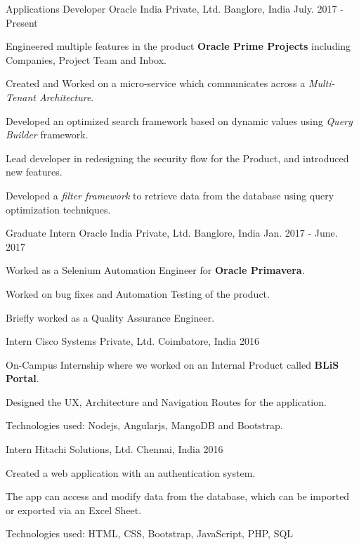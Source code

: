 \begin{cventries}
  \cventry
    {Applications Developer}
    {Oracle India Private, Ltd.}
    {Banglore, India}
    {July. 2017 - Present}
    {
      \begin{cvitems}
        \item {Engineered multiple features in the product \textbf{Oracle Prime Projects} including Companies, Project Team and Inbox.}
        \item {Created and Worked on a micro-service which communicates across a \textit{Multi-Tenant Architecture}.}
        \item {Developed an optimized search framework based on dynamic values using \textit{Query Builder} framework.}
        \item {Lead developer in redesigning the security flow for the Product, and introduced new features.}
        \item {Developed a \textit{filter framework} to retrieve data from the database using query optimization techniques.}
      \end{cvitems}
    }
  \cventry
    {Graduate Intern}
    {Oracle India Private, Ltd.}
    {Banglore, India}
    {Jan. 2017 - June. 2017}
    {
      \begin{cvitems}
        \item {Worked as a Selenium Automation Engineer for \textbf{Oracle Primavera}.}
        \item {Worked on bug fixes and Automation Testing of the product.}
        \item {Briefly worked as a Quality Assurance Engineer.}
      \end{cvitems}
    }
  \cventry
    {Intern}
    {Cisco Systems Private, Ltd.}
    {Coimbatore, India}
    {2016}
    {
      \begin{cvitems}
        \item {On-Campus Internship where we worked on an Internal Product called \textbf{BLiS Portal}.}
        \item {Designed the UX, Architecture and Navigation Routes for the application.}
        \item {Technologies used: Nodejs, Angularjs, MangoDB and Bootstrap.}
      \end{cvitems} 
    }
  \cventry
    {Intern}
    {Hitachi Solutions, Ltd.}
    {Chennai, India}
    {2016}
    {
      \begin{cvitems}
        \item {Created a web application with an authentication system.}
        \item {The app can access and modify data from the database, which can be imported or exported via an Excel Sheet.}
        \item {Technologies used: HTML, CSS, Bootstrap, JavaScript, PHP, SQL }
      \end{cvitems}
    }
\end{cventries}
